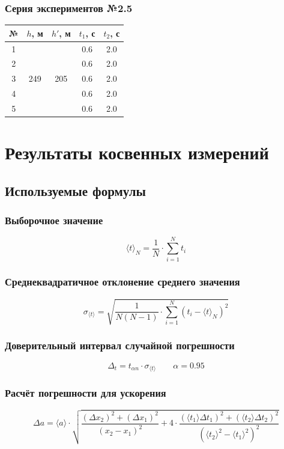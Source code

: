 \documentclass[12pt,a4paper]{article}
\begin{document}
\subsubsection*{Серия экспериментов №2.5}
\begin{tabular}{|c|c|c|c|c|}
    \hline
    № & $h$, м               & $h'$, м              & $t_1$, с & $t_2$, с \\
    \hline
    1 & \multirow{5}{*}{249} & \multirow{5}{*}{205} & 0.6      & 2.0      \\
    \cline{1-1} \cline{4-5} 
    2 &                      &                      & 0.6      & 2.0      \\
    \cline{1-1} \cline{4-5} 
    3 &                      &                      & 0.6      & 2.0      \\
    \cline{1-1} \cline{4-5} 
    4 &                      &                      & 0.6      & 2.0      \\
    \cline{1-1} \cline{4-5} 
    5 &                      &                      & 0.6      & 2.0      \\
    \hline
\end{tabular}
\section{Результаты косвенных измерений}
\subsection{Используемые формулы}
\subsubsection{Выборочное значение}
$$\langle t\rangle_N=\frac{1}{N}\cdot \sum_{i=1}^Nt_i$$
\subsubsection{Среднеквадратичное отклонение среднего значения}
$$\sigma_{\langle t\rangle}=\sqrt{\frac{1}{N(N-1)}\cdot\sum_{i=1}^N(t_i - \langle t\rangle_N)^2}$$
\subsubsection{Доверительный интервал случайной погрешности}
$$\Delta_t=t_{\alpha n}\cdot\sigma_{\langle t\rangle}\qquad\alpha=0.95$$
\subsubsection{Расчёт погрешности для ускорения}
$$\Delta a = \langle a \rangle\cdot\sqrt{\frac{(\Delta x_2)^2 + (\Delta x_1)^2}{(x_2 - x_1)^2} + 4 \cdot \frac{(\langle t_1 \rangle\Delta t_1)^2 + (\langle t_2 \rangle\Delta t_2)^2}{(\langle t_2 \rangle^2 - \langle t_1 \rangle^2)^2}}$$
\end{document}
